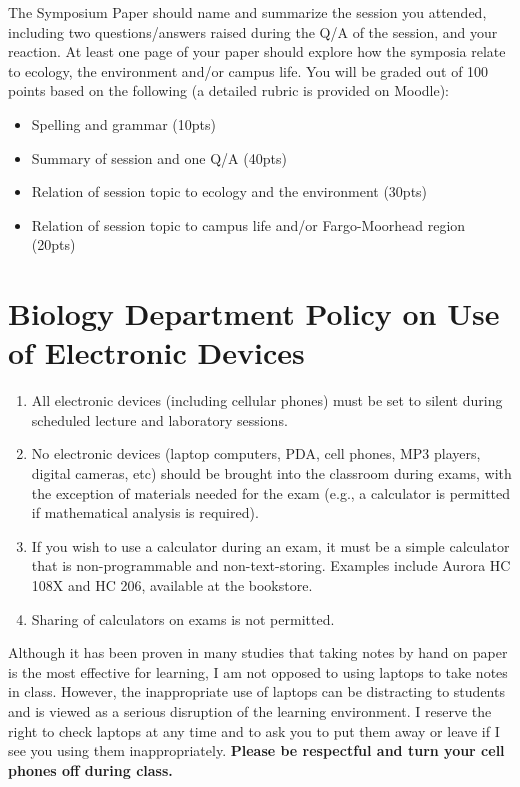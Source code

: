 \documentclass{tufte-handout}
\begin{document}
\begin{fullwidth}
The Symposium Paper should name and summarize the session you attended, including two questions/answers raised during the Q/A of the session, and your reaction. At least one page of your paper should explore how the symposia relate to ecology, the environment and/or campus life. You will be graded out of 100 points based on the following (a detailed rubric is provided on Moodle): 

\begin{itemize}
\item Spelling and grammar (10pts)
\item Summary of session and one Q/A (40pts)
\item Relation of session topic to ecology and the environment (30pts)
\item Relation of session topic to campus life and/or Fargo-Moorhead region (20pts)
\end{itemize}



\section{Biology Department Policy on Use of Electronic Devices}

\begin{enumerate}
\item All electronic devices (including cellular phones) must be set to silent during scheduled lecture and laboratory sessions.
\item No electronic devices (laptop computers, PDA, cell phones, MP3 players, digital cameras, etc) should be brought into the classroom during exams, with the exception of materials needed for the exam (e.g., a calculator is permitted if mathematical analysis is required).
\item If you wish to use a calculator during an exam, it must be a simple calculator that is non-programmable and non-text-storing. Examples include Aurora HC 108X and HC 206, available at the bookstore. 
\item Sharing of calculators on exams is not permitted.
\end{enumerate}

Although it has been proven in many studies that taking notes by hand on paper is the most effective for learning, I am not opposed to using laptops to take notes in class. However, the inappropriate use of laptops can be distracting to students and is viewed as a serious disruption of the learning environment. I reserve the right to check laptops at any time and to ask you to put them away or leave if I see you using them inappropriately. \textbf{Please be respectful and turn your cell phones off during class.}

\end{fullwidth}
\end{document}
